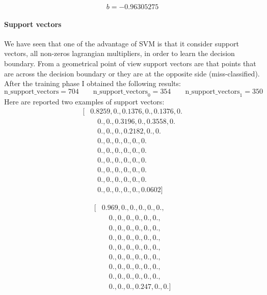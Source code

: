 \documentclass[11pt,a4paper]{article}
\begin{document}
$$ b = -0.96305275$$

\paragraph{Support vectors} We have seen that one of the advantage of SVM is that it consider support vectors, all non-zeros lagrangian multipliers, in order to learn the decision boundary. From a geometrical point of view support vectors are that points that are across the decision boundary or they are at the opposite side (miss-classified). After the training phase I obtained the following results:
$$ \text{n\_support\_vectors} = 704 \qquad \text{n\_support\_vectors}_0 = 354 \qquad \text{n\_support\_vectors}_1 = 350$$
Here are reported two examples of support vectors:
\begin{equation*}
\begin{split}
[&0.8259, 0., 0.1376, 0., 0.1376, 0.\\
& \quad 0., 0., 0.3196, 0., 0.3558, 0.\\
& \quad 0., 0., 0., 0.2182, 0., 0.\\
& \quad 0., 0., 0., 0., 0., 0.\\
& \quad 0., 0., 0., 0., 0., 0.\\
& \quad 0., 0., 0., 0., 0., 0.\\
& \quad 0., 0., 0., 0., 0., 0.\\
& \quad 0., 0., 0., 0., 0., 0.\\
& \quad 0., 0., 0., 0., 0., 0.0602]
\end{split}
\end{equation*}

\begin{equation*}
\begin{split}
[&0.969 , 0. , 0. , 0. , 0. , 0. , \\
& \quad 0. , 0. , 0. , 0. , 0. , 0. , \\
& \quad 0. , 0. , 0. , 0. , 0. , 0. , \\
& \quad 0. , 0. , 0. , 0. , 0. , 0. , \\
& \quad 0. , 0. , 0. , 0. , 0. , 0. , \\
& \quad 0. , 0. , 0. , 0. , 0. , 0. , \\
& \quad 0. , 0. , 0. , 0. , 0. , 0. , \\
& \quad 0. , 0. , 0. , 0. , 0. , 0. , \\
& \quad 0. , 0. , 0. , 0.247 , 0. , 0.]
\end{split}
\end{equation*}
\end{document}
